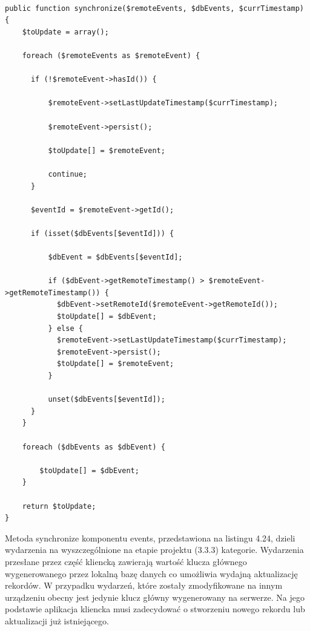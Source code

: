 \begin{lstlisting}[caption=Modyfikacja wydarzeń w metodzie synchronize komponentu Events., label=amb, captionpos=b]

public function synchronize($remoteEvents, $dbEvents, $currTimestamp) {
   	$toUpdate = array();

   	foreach ($remoteEvents as $remoteEvent) {

      if (!$remoteEvent->hasId()) {

	      $remoteEvent->setLastUpdateTimestamp($currTimestamp);

          $remoteEvent->persist();

          $toUpdate[] = $remoteEvent;

          continue;
      }

      $eventId = $remoteEvent->getId();

      if (isset($dbEvents[$eventId])) {

          $dbEvent = $dbEvents[$eventId];

          if ($dbEvent->getRemoteTimestamp() > $remoteEvent->getRemoteTimestamp()) {
          	$dbEvent->setRemoteId($remoteEvent->getRemoteId());
            $toUpdate[] = $dbEvent;
          } else {
            $remoteEvent->setLastUpdateTimestamp($currTimestamp);
            $remoteEvent->persist();
            $toUpdate[] = $remoteEvent;
          }

          unset($dbEvents[$eventId]);
      }
    }

    foreach ($dbEvents as $dbEvent) {

       	$toUpdate[] = $dbEvent;
    }

   	return $toUpdate;
}

\end{lstlisting}

Metoda synchronize komponentu events, przedstawiona na listingu 4.24, dzieli wydarzenia na wyszczególnione na etapie projektu (3.3.3) kategorie. Wydarzenia przesłane przez część kliencką zawierają wartość klucza głównego wygenerowanego przez lokalną bazę danych co umożliwia wydajną aktualizację rekordów. W przypadku wydarzeń, które zostały zmodyfikowane na innym urządzeniu obecny jest jedynie klucz główny wygenerowany na serwerze. Na jego podstawie aplikacja kliencka musi zadecydować o stworzeniu nowego rekordu lub aktualizacji już istniejącego.
